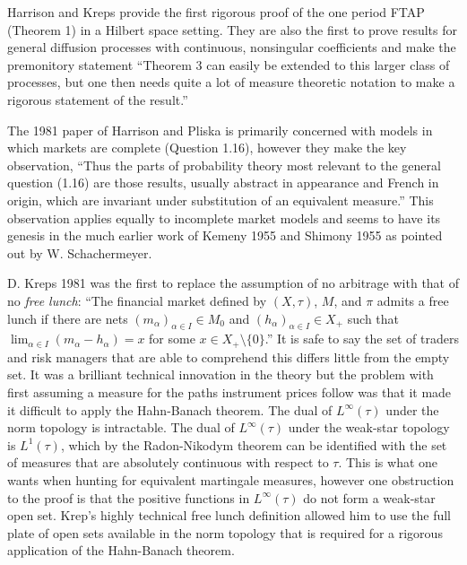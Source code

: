 \documentclass[fleqn]{amsart}
\begin{document}
Harrison and Kreps \cite{HarKre1979} provide the first rigorous
proof of the one period FTAP (Theorem 1) in a Hilbert space setting. They
are also the first to prove results for general diffusion processes with
continuous, nonsingular coefficients and make the premonitory statement
``Theorem 3 can easily be extended to this larger class of processes,
but one then needs quite a lot of measure theoretic notation to make a
rigorous statement of the result.''

The 1981 paper of Harrison and Pliska \cite{HarPli1981} is primarily
concerned with models in which markets are complete (Question 1.16),
however they make the key observation, ``Thus the parts of probability
theory most relevant to the general question (1.16) are those results,
usually abstract in appearance and French in origin, which are invariant
under substitution of an equivalent measure.'' This observation applies
equally to incomplete market models and seems to have its genesis in
the much earlier work of Kemeny 1955 \cite{Kem1955} and Shimony 1955
\cite{Shi1955} as pointed out by W. Schachermeyer.

D. Kreps 1981 \cite{Kre1981} was the first to replace the assumption of
no arbitrage with that of no {\em free lunch}: ``The financial market
defined by $(X,\tau)$, $M$, and $\pi$ admits a free lunch if there are
nets $(m_\alpha)_{\alpha \in I} \in M_0$ and $(h_\alpha)_{\alpha\in I}
\in X_+$ such that $\lim_{\alpha\in I} (m_\alpha -  h_\alpha) = x$ for
some $x\in X_+\setminus\{0\}$.'' It is safe to say the set of traders
and risk managers that are able to comprehend this differs little from
the empty set.  It was a brilliant technical innovation in the theory but
the problem with first assuming a measure for the paths instrument prices
follow was that it made it difficult to apply the Hahn-Banach theorem. The
dual of $L^\infty(\tau)$ under the norm topology is intractable. The
dual of $L^\infty(\tau)$ under the weak-star topology is $L^1(\tau)$,
which by the Radon-Nikodym theorem can be identified with the set of
measures that are absolutely continuous with respect to $\tau$. This
is what one wants when hunting for equivalent martingale measures,
however one obstruction to the proof is that the positive functions
in $L^\infty(\tau)$ do not form a weak-star open set. Krep's highly
technical free lunch definition allowed him to use the full plate of
open sets available in the norm topology that is required for a rigorous
application of the Hahn-Banach theorem.
\end{document}
